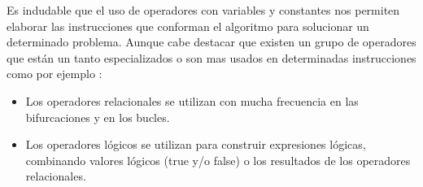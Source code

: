 Es indudable que el uso de operadores con variables y constantes nos permiten elaborar las instrucciones que conforman el algoritmo para solucionar un determinado problema. Aunque cabe destacar que existen un grupo de operadores que están un tanto especializados o son mas usados en determinadas instrucciones como por ejemplo :

\begin{itemize}
	\item Los operadores relacionales se utilizan con mucha frecuencia en las bifurcaciones y en los bucles.
	\item Los operadores lógicos se utilizan para construir expresiones lógicas, combinando valores lógicos
(true y/o false) o los resultados de los operadores relacionales.
\end{itemize}



